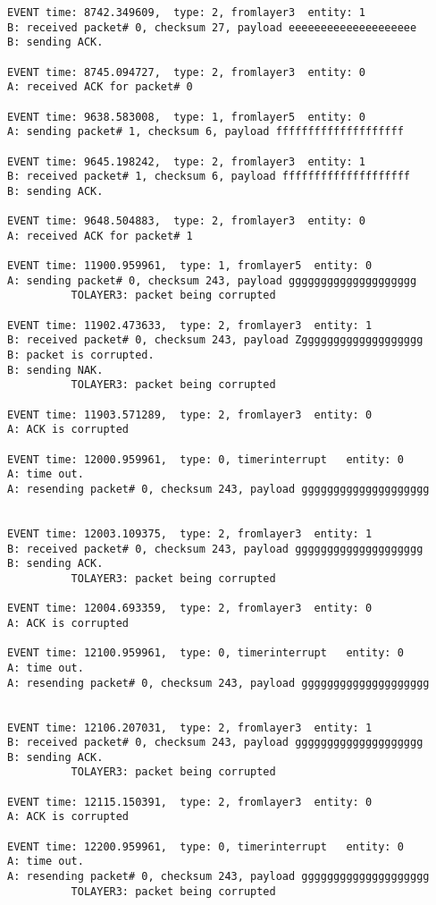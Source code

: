\documentclass[12pt]{article}
\begin{document}
\begin{verbatim}
EVENT time: 8742.349609,  type: 2, fromlayer3  entity: 1
B: received packet# 0, checksum 27, payload eeeeeeeeeeeeeeeeeeee
B: sending ACK.

EVENT time: 8745.094727,  type: 2, fromlayer3  entity: 0
A: received ACK for packet# 0

EVENT time: 9638.583008,  type: 1, fromlayer5  entity: 0
A: sending packet# 1, checksum 6, payload ffffffffffffffffffff	

EVENT time: 9645.198242,  type: 2, fromlayer3  entity: 1
B: received packet# 1, checksum 6, payload ffffffffffffffffffff
B: sending ACK.

EVENT time: 9648.504883,  type: 2, fromlayer3  entity: 0
A: received ACK for packet# 1

EVENT time: 11900.959961,  type: 1, fromlayer5  entity: 0
A: sending packet# 0, checksum 243, payload gggggggggggggggggggg	
          TOLAYER3: packet being corrupted

EVENT time: 11902.473633,  type: 2, fromlayer3  entity: 1
B: received packet# 0, checksum 243, payload Zggggggggggggggggggg
B: packet is corrupted.
B: sending NAK.
          TOLAYER3: packet being corrupted

EVENT time: 11903.571289,  type: 2, fromlayer3  entity: 0
A: ACK is corrupted

EVENT time: 12000.959961,  type: 0, timerinterrupt   entity: 0
A: time out. 
A: resending packet# 0, checksum 243, payload gggggggggggggggggggg


EVENT time: 12003.109375,  type: 2, fromlayer3  entity: 1
B: received packet# 0, checksum 243, payload gggggggggggggggggggg
B: sending ACK.
          TOLAYER3: packet being corrupted

EVENT time: 12004.693359,  type: 2, fromlayer3  entity: 0
A: ACK is corrupted

EVENT time: 12100.959961,  type: 0, timerinterrupt   entity: 0
A: time out. 
A: resending packet# 0, checksum 243, payload gggggggggggggggggggg


EVENT time: 12106.207031,  type: 2, fromlayer3  entity: 1
B: received packet# 0, checksum 243, payload gggggggggggggggggggg
B: sending ACK.
          TOLAYER3: packet being corrupted

EVENT time: 12115.150391,  type: 2, fromlayer3  entity: 0
A: ACK is corrupted

EVENT time: 12200.959961,  type: 0, timerinterrupt   entity: 0
A: time out. 
A: resending packet# 0, checksum 243, payload gggggggggggggggggggg
          TOLAYER3: packet being corrupted


\end{verbatim}
\end{document}
